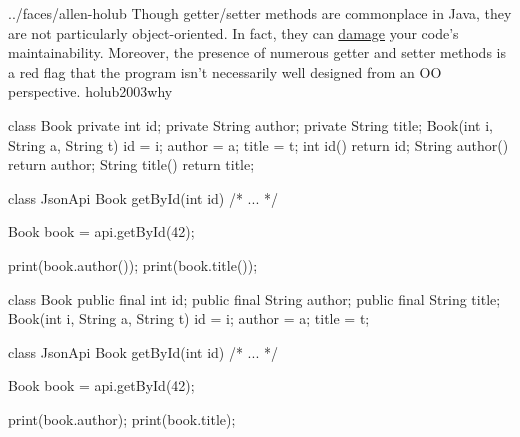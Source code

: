 \documentclass{article}
\begin{document}
\qte
  {../faces/allen-holub}
  {Though getter/setter methods are commonplace in Java, they are not particularly object-oriented. In fact, they can \ul{damage} your code's maintainability. Moreover, the presence of numerous getter and setter methods is a red flag that the program isn't necessarily well designed from an OO perspective.}
  {holub2003why}

\begin{pptWide}{2}
{\small\begin{ffcode}
class Book {
  private int id;
  private String author;
  private String title;
  Book(int i, String a, String t)
    { id = i; author = a; title = t; }
  int id() { return id; }
  String author() { return author; }
  String title() { return title; }
}
\end{ffcode}
}
\par\columnbreak\par
{\small\begin{ffcode}
class JsonApi {
  Book getById(int id) { /* ... */ }
}

Book book = api.getById(42);

print(book.author());
print(book.title());
\end{ffcode}
}
\end{pptWide}
\par
\plush{}

\begin{pptWide}{2}
{\small\begin{ffcode}
class Book {
  public final int id;
  public final String author;
  public final String title;
  Book(int i, String a, String t)
    { id = i; author = a; title = t; }
}
\end{ffcode}
}
\par\columnbreak\par
{\small\begin{ffcode}
class JsonApi {
  Book getById(int id) { /* ... */ }
}

Book book = api.getById(42);

print(book.author);
print(book.title);
\end{ffcode}
}
\end{pptWide}
\par
\plush{}
\end{document}
